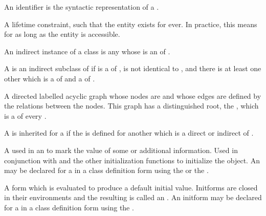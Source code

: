 \begin{optDefinition}
\begin{definitions}
     An identifier is the
    syntactic representation of a .

     A lifetime
    constraint, such that the entity exists for ever.  In practice, this means
    for as long as the entity is accessible.

     An indirect instance of a
    class  is any  whose  is an
      of .

     A  is an
    indirect subclass of  if  is a 
    of ,  is not identical to , and
    there is at least one other  which is a  of
     and a  of .

      A directed
    labelled acyclic graph whose nodes are  and whose edges are
    defined by the  relations between the nodes.  This
    graph has a distinguished root, the  , which is
    a  of every .

     A   is inherited for a
     if the   is defined for another
     which is a direct or indirect  of
    .

      A  used in an
     to mark the value of some  or additional
    information.  Used in conjunction with  and the other
     initialization functions to initialize the object.  An
     may be declared for a  in a class definition
    form using the   or the
     .

      A form which is evaluated to
    produce a default initial  value.  Initforms are closed in their
     environments and the resulting  is called an
    .  An initform may be declared for a  in a
    class definition form using the  .


\end{definitions}
\end{optDefinition}
